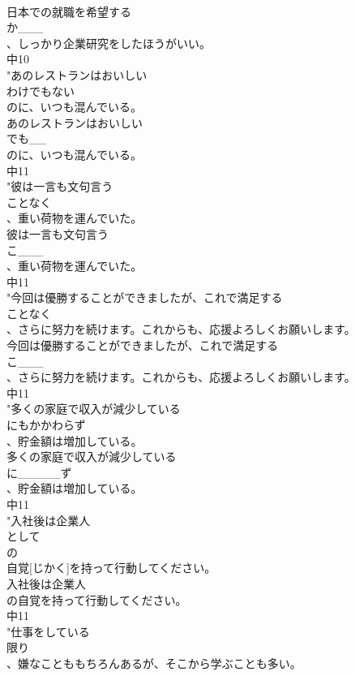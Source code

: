 \documentclass[8pt]{extreport}
\begin{document}
\begin{CJK}{UTF8}{min}
\\	日本での就職を希望する
\\	か___
\\	、しっかり企業研究をしたほうがいい。
\\	中10
\\	"あのレストランはおいしい
\\	わけでもない
\\	のに、いつも混んでいる。
\\	あのレストランはおいしい
\\	でも__
\\	のに、いつも混んでいる。
\\	中11
\\	"彼は一言も文句言う
\\	ことなく
\\	、重い荷物を運んでいた。
\\	彼は一言も文句言う
\\	こ___
\\	、重い荷物を運んでいた。
\\	中11
\\	"今回は優勝することができましたが、これで満足する
\\	ことなく
\\	、さらに努力を続けます。これからも、応援よろしくお願いします。
\\	今回は優勝することができましたが、これで満足する
\\	こ___
\\	、さらに努力を続けます。これからも、応援よろしくお願いします。
\\	中11
\\	"多くの家庭で収入が減少している
\\	にもかかわらず
\\	、貯金額は増加している。
\\	多くの家庭で収入が減少している
\\	に_____ず
\\	、貯金額は増加している。
\\	中11
\\	"入社後は企業人
\\	として
\\	の
\\	自覚[じかく]を持って行動してください。
\\	入社後は企業人
\\	の自覚を持って行動してください。
\\	中11
\\	"仕事をしている
\\	限り
\\	、嫌なことももちろんあるが、そこから学ぶことも多い。

\end{CJK}
\end{document}
